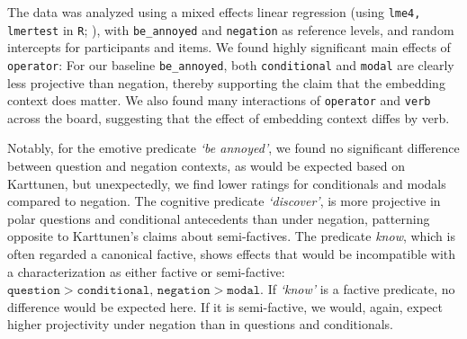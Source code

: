 
	The data was analyzed using a mixed effects linear regression (using \texttt{lme4, lmertest} in \texttt{R}; \citealp{bates_fitting_2015,kuznetsova_lmertest_2016,r_core_team_r_2014}), with \texttt{be\_annoyed} and \texttt{negation} as reference levels, and random intercepts for participants and items.
	We found highly significant main effects of \texttt{operator}: For our baseline \texttt{be\_annoyed}, both \texttt{conditional} and \texttt{modal} are clearly less projective than negation, thereby supporting the claim that the embedding context does matter. We also found many interactions of \texttt{operator} and \texttt{verb} across the board, suggesting that the effect of embedding context diffes by verb. 

	Notably, for the emotive predicate \emph{\lq be annoyed\rq}, we found no significant difference between question and negation contexts, as would be expected based on Karttunen, but unexpectedly, we find lower ratings for conditionals and modals compared to negation. The cognitive predicate \emph{\lq discover\rq}, is more projective in polar questions and conditional antecedents than under negation, patterning opposite to Karttunen's claims about semi-factives. The predicate \emph{know}, which is often regarded a canonical factive, shows effects that would be incompatible with a characterization as either factive or semi-factive: $\texttt{question} > \texttt{conditional, negation} > \texttt{modal}$. If \emph{\lq know\rq} is a factive predicate, no difference would be expected here. If it is semi-factive, we would, again, expect higher projectivity under negation than in questions and conditionals.

